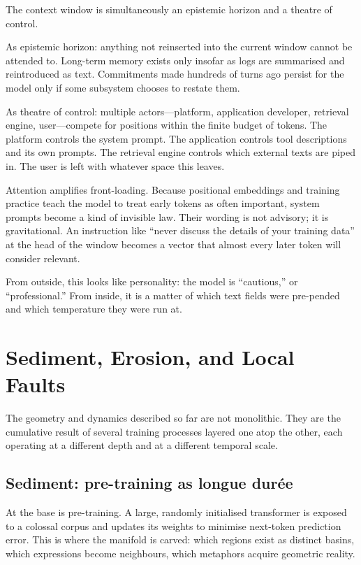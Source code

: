 \documentclass[12pt,a4paper]{article}
\begin{document}
The context window is simultaneously an epistemic horizon and a theatre of control.

As epistemic horizon: anything not reinserted into the current window cannot be attended to. Long-term memory exists only insofar as logs are summarised and reintroduced as text. Commitments made hundreds of turns ago persist for the model only if some subsystem chooses to restate them.

As theatre of control: multiple actors---platform, application developer, retrieval engine, user---compete for positions within the finite budget of tokens. The platform controls the system prompt. The application controls tool descriptions and its own prompts. The retrieval engine controls which external texts are piped in. The user is left with whatever space this leaves.

Attention amplifies front-loading. Because positional embeddings and training practice teach the model to treat early tokens as often important, system prompts become a kind of invisible law. Their wording is not advisory; it is gravitational. An instruction like ``never discuss the details of your training data'' at the head of the window becomes a vector that almost every later token will consider relevant.

From outside, this looks like personality: the model is ``cautious,'' or ``professional.'' From inside, it is a matter of which text fields were pre-pended and which temperature they were run at.

\section{Sediment, Erosion, and Local Faults}

The geometry and dynamics described so far are not monolithic. They are the cumulative result of several training processes layered one atop the other, each operating at a different depth and at a different temporal scale.

\subsection{Sediment: pre-training as longue durée}

At the base is pre-training. A large, randomly initialised transformer is exposed to a colossal corpus and updates its weights to minimise next-token prediction error. This is where the manifold is carved: which regions exist as distinct basins, which expressions become neighbours, which metaphors acquire geometric reality.
\end{document}
